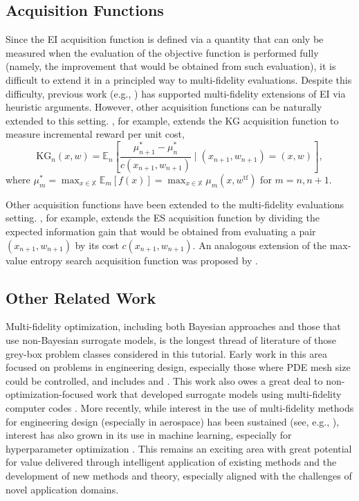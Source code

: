 \documentclass{wscpaperproc}
\newcommand{\E}{\mathbb{E}}
\newcommand{\X}{\mathbb{X}}
\newcommand{\KG}{\mathrm{KG}}
\theoremstyle{wsc}
\begin{document}
\subsection{Acquisition Functions}
Since the EI acquisition function is defined via a quantity that can only be measured when the evaluation of the objective function is performed fully (namely, the  improvement that would be obtained from such evaluation), it is difficult to extend it in a principled way to multi-fidelity evaluations.  Despite this difficulty, previous work (e.g., 
) has supported multi-fidelity extensions of EI
via heuristic arguments. %
However, other acquisition functions can be naturally extended to this setting. , for example, extends the KG acquisition function 
to measure incremental reward per unit cost,
\begin{equation*}
    \KG_n(x,w) = \E_n\left[\frac{\mu_{n+1}^* - \mu_n^*}{c(x_{n+1},w_{n+1})}\mid(x_{n+1}, w_{n+1})=(x,w)\right],
\end{equation*}
where $\mu_m^* = \max_{x\in\X}\E_m[f(x)]=    \max_{x\in\X}\mu_m(x, w^{\mathrm{tf}})$ for $m=n, n+1$.  

Other acquisition functions have been extended to the multi-fidelity evaluations setting.
, for example, extends the ES acquisition function by dividing the expected information gain that would be obtained from evaluating a pair $(x_{n+1},w_{n+1})$ by its cost $c(x_{n+1},w_{n+1})$. An analogous extension of the max-value entropy search acquisition function was proposed by . 

\subsection{Other Related Work}
Multi-fidelity optimization, including both Bayesian approaches and those that use non-Bayesian surrogate models, is the longest thread of literature of those grey-box problem classes considered in this tutorial.  Early work in this area focused on problems in engineering design, especially those where PDE mesh size could be controlled, and includes
 and . 
This work also owes a great deal to non-optimization-focused work that developed surrogate models using multi-fidelity computer codes .
More recently, while interest in the use of multi-fidelity methods for engineering design (especially in aerospace) has been sustained (see, e.g., ), interest has also grown in its use in machine learning, especially for hyperparameter optimization .
This remains an exciting area with great potential for value delivered through intelligent application of existing methods and the development of new methods and theory, especially aligned with the challenges of novel application domains.
\end{document}
